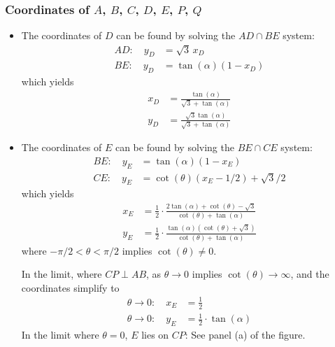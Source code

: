 \subsubsection*{Coordinates of $A$, $B$, $C$, $D$, $E$, $P$, $Q$}
\begin{itemize}
\item The coordinates of $D$ can be found by solving the $AD \cap BE$ system:
\begin{align*}
AD:\quad 
y_{D} & = \sqrt{3}\,x_{D}
\\
BE:\quad 
y_{D} & = \tan(\alpha) (1-x_{D})
\end{align*}
which yields
\begin{align*}
x_{D} & = \frac{\tan(\alpha)}{\sqrt{3}+\tan(\alpha)}
\\
y_{D} & = \frac{\sqrt{3}\tan(\alpha)}{\sqrt{3}+\tan(\alpha)}
\end{align*}

\item The coordinates of $E$ can be found by solving the $BE \cap CE$ system:
\begin{align*}
BE:\quad
y_{E} & = \tan(\alpha) (1-x_{E})
\\
CE:\quad
y_{E} & = \cot(\theta) (x_{E}-1/2) + \sqrt{3}/2
\end{align*}
which yields
\begin{align*}
x_{E} & = \frac{1}{2} \cdot \frac{2\tan(\alpha)+\cot(\theta)-\sqrt{3}}{\cot(\theta)+\tan(\alpha)}
\\
y_{E} & = \frac{1}{2} \cdot \frac{\tan(\alpha)(\cot(\theta)+\sqrt{3})}{\cot(\theta)+\tan(\alpha)}
\end{align*}
where $-\pi/2<\theta<\pi/2$ implies $\cot(\theta)\ne0$.

In the limit, where $CP \perp AB$, as $\theta\to0$ implies $\cot(\theta)\to\infty$, and the coordinates simplify to
\begin{align*}
\theta \to 0: \quad
x_{E} & = \frac{1}{2}
\\
\theta \to 0: \quad
y_{E} & = \frac{1}{2} \cdot \tan(\alpha)
\end{align*}
In the limit where $\theta=0$, $E$ lies on $CP$: See panel (a) of the figure.


\end{itemize}
